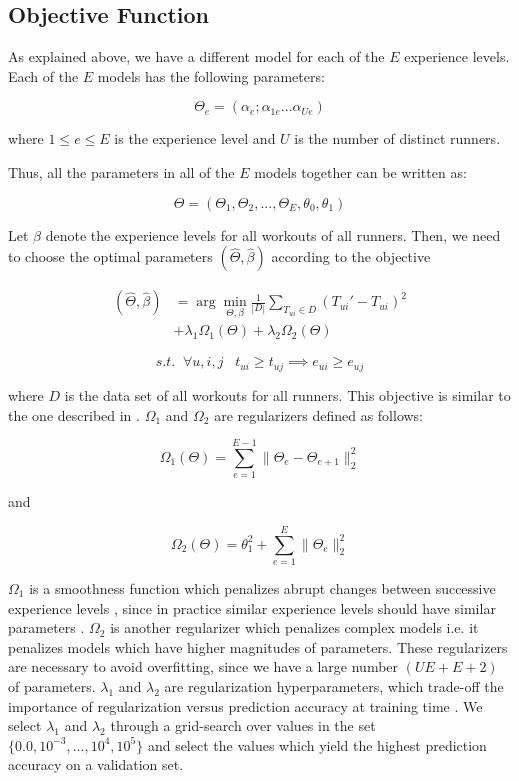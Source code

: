 \documentclass{acm_proc_article-sp}
\begin{document}
\subsection{Objective Function}
As explained above, we have a different model for each of the $E$ experience levels. Each of the $E$ models has the following parameters:

$$\Theta_e = (\alpha_e; \alpha_{1e}...\alpha_{Ue})$$

where $1 \leq e \leq E$ is the experience level and $U$ is the number of distinct runners.

Thus, all the parameters in all of the $E$ models together can be written as:

$$\Theta = (\Theta_1, \Theta_2,..., \Theta_E, \theta_0, \theta_1)$$

Let $\beta$ denote the experience levels for all workouts of all runners. Then, we need to choose the optimal parameters $(\hat{\Theta}, \hat{\beta})$ according to the objective


\begin{align}
\label{eqnObjective}
(\hat{\Theta}, \hat{\beta})  &= \arg\min_{\Theta,\beta}\frac{1}{|D|} \sum_{T_{ui} \in D}(T_{ui}' - T_{ui})^2 \nonumber \\
 & + \lambda_1\Omega_1(\Theta) + \lambda_2\Omega_2(\Theta)
\end{align}

$$s.t. \; \; \forall u,i,j \; \; \; t_{ui} \geq t_{uj} \implies e_{ui} \geq e_{uj} $$

where $D$ is the data set of all workouts for all runners. This objective is similar to the one described in \cite{www13}. $\Omega_1$ and $\Omega_2$ are regularizers defined as follows:

$$\Omega_1(\Theta) = \sum_{e=1}^{E-1}{\|\Theta_e - \Theta_{e+1}\|_2^2}$$

and

$$\Omega_2(\Theta) = \theta_1^2 + \sum_{e=1}^{E}{\|\Theta_e \|_2^2}$$

$\Omega_1$ is a smoothness function which penalizes abrupt changes between successive experience levels \cite{www13}, since in practice similar experience levels should have similar parameters \cite{www13}. $\Omega_2$ is another regularizer which penalizes complex models i.e. it penalizes models which have higher magnitudes of parameters. These regularizers are necessary to avoid overfitting, since we have a large number $(UE + E + 2)$ of parameters. $\lambda_1$ and $\lambda_2$ are regularization hyperparameters, which trade-off the importance of regularization versus prediction accuracy at training time \cite{www13}. We select $\lambda_1$ and $\lambda_2$ through a grid-search over values in the set $\{0.0, 10^{-3},..., 10^4, 10^5\}$ and select the values which yield the highest prediction accuracy on a validation set.
\end{document}

